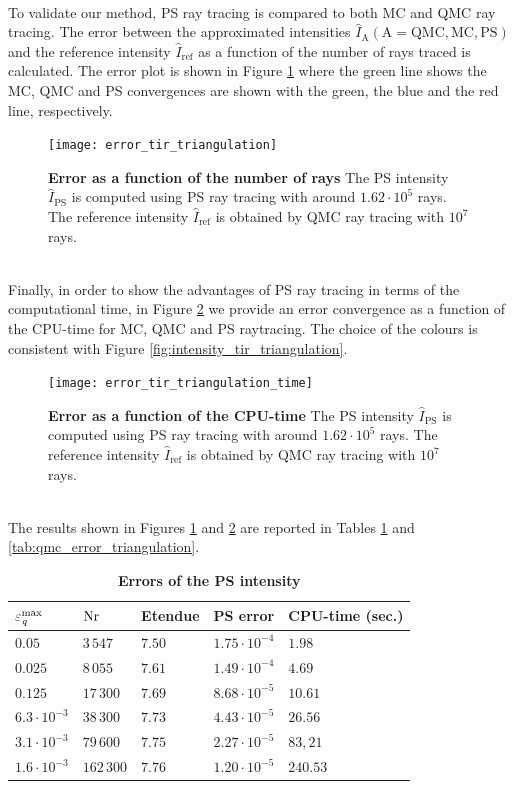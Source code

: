 \\ \indent
To validate our method, PS ray tracing is compared to both MC and QMC ray tracing. The error between the approximated intensities $\hat{I}_{\textrm{A}} (\textrm{A}=\textrm{QMC}, \textrm{MC}, \textrm{PS})$ and the reference intensity $\hat{I}_{\textrm{ref}}$ as a function of the number of rays traced is calculated. The error plot is shown in Figure \ref{fig:error_tir_triangulation} where the green line shows the MC, QMC and PS convergences are shown with the green, the blue and the red line, respectively. 
 \begin{figure}[ht]
  \center
  \texttt{[image: error\_tir\_triangulation]}
  \caption{\textbf{Error as a function of the number of rays} The PS intensity $\hat{I}_{\textrm{PS}}$ is computed using PS ray tracing with around $1.62\cdot 10^5$ rays. The reference intensity $\hat{I}_{\textrm{ref}}$ is obtained by QMC ray tracing with $10^7$ rays.}
  \label{fig:error_tir_triangulation}
\end{figure}
\\ \indent Finally, in order to show the advantages of PS ray tracing in terms of the computational time, in Figure \ref{fig:error_tir_triangulation_time} we provide an error convergence as a function of the CPU-time for MC, QMC and PS raytracing. The choice of the colours is consistent with Figure \ref{fig:intensity_tir_triangulation}.
\begin{figure}[ht]
  \center
  \texttt{[image: error\_tir\_triangulation\_time]}
  \caption{\textbf{Error as a function of the CPU-time} The PS intensity $\hat{I}_{\textrm{PS}}$ is computed using PS ray tracing with around $1.62\cdot 10^5$ rays. The reference intensity $\hat{I}_{\textrm{ref}}$ is obtained by QMC ray tracing with $10^7$ rays.}
  \label{fig:error_tir_triangulation_time}
\end{figure}
\\ \indent The results shown in Figures \ref{fig:error_tir_triangulation} and \ref{fig:error_tir_triangulation_time} are reported in Tables \ref{tab:ps_error_triangulation} and  \ref{tab:qmc_error_triangulation}.
\begin{table}[ht] \label{tab:table_tir_triangulation}
\centering
\caption{\bf Errors of the PS intensity}
\begin{tabular}{lllll}
 \hline   $\varepsilon_{\textit{q}}^{\textrm{max}} $  & $\textrm{Nr}$ & Etendue & PS error & CPU-time (sec.) \\
  \hline 
 $0.05$ & $3\,547$   & $7.50$   &  $1.75\cdot10^{-4}$ & $1.98$\\
$0.025$  & $8\,055$    & $7.61$    & $1.49\cdot 10^{-4}$ & $4.69$ \\
$0.125$  & $17\,300$    & $7.69$  & $8.68\cdot 10^{-5}$ & $10.61$\\
 $6.3 \cdot 10^{-3}$  & $38\,300$  & $7.73$   & $4.43\cdot 10^{-5}$ & $26.56$\\
 $3.1 \cdot 10^{-3}$ & $79\,600$  & $7.75$    & $2.27\cdot 10^{-5}$ & $83,21$\\
$1.6 \cdot 10^{-3}$ & $162\,300$  & $7.76$    & $1.20\cdot 10^{-5}$ & $240.53$\\
 \hline
 \end{tabular}
 \label{tab:ps_error_triangulation}
 \end{table}
